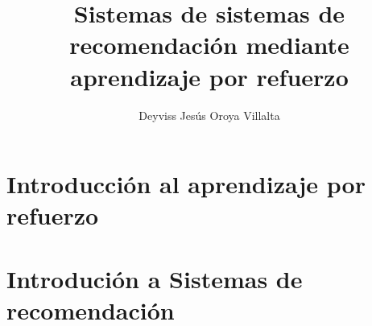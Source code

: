 \documentclass{book}
\begin{document}
%
\frontmatter          %
%
\pagestyle{plain}  %
%
 

\mainmatter              %
%
\title{Sistemas de sistemas de recomendación mediante aprendizaje por refuerzo}

%
\author{Deyviss Jesús Oroya Villalta}

 



\maketitle              %



\tableofcontents
\listoffigures







%
\chapter{Introducción al aprendizaje por refuerzo}



\chapter{Introdución a Sistemas de recomendación}


%


\end{document}
